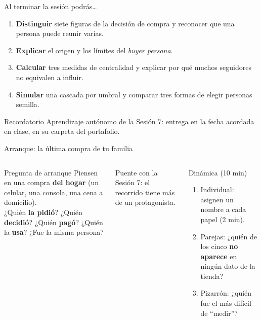 \documentclass[aspectratio=169,xcolor=dvipsnames]{beamer}
\begin{document}
\begin{frame}{Al terminar la sesión podrás\ldots}
\begin{enumerate}
  \item \textbf{Distinguir} siete figuras de la decisión de compra y reconocer que una persona puede reunir varias.
  \vspace{4pt}
  \item \textbf{Explicar} el origen y los límites del \textit{buyer persona}.
  \vspace{4pt}
  \item \textbf{Calcular} tres medidas de centralidad y explicar por qué muchos seguidores no equivalen a influir.
  \vspace{4pt}
  \item \textbf{Simular} una cascada por umbral y comparar tres formas de elegir personas semilla.
\end{enumerate}
\vspace{6pt}
\begin{alertblock}{Recordatorio}
  Aprendizaje autónomo de la Sesión 7: entrega en la fecha acordada en clase, en su carpeta del portafolio.
\end{alertblock}
\end{frame}

\begin{frame}{Arranque: la última compra de tu familia}
\begin{columns}[T]
  \begin{exampleblock}{Pregunta de arranque}
    Piensen en una compra \textbf{del hogar} (un celular, una consola, una cena a domicilio).\\[4pt]
    ¿Quién \textbf{la pidió}? ¿Quién \textbf{decidió}? ¿Quién \textbf{pagó}? ¿Quién la \textbf{usa}? ¿Fue la misma persona?
  \end{exampleblock}
  \vspace{4pt}
  {\small\color{IPNgris} Puente con la Sesión 7: el recorrido tiene más de un protagonista.}
  \begin{block}{Dinámica (10 min)}
    \small
    \begin{enumerate}
      \item Individual: asignen un nombre a cada papel (2 min).
      \item Parejas: ¿quién de los cinco \textbf{no aparece} en ningún dato de la tienda?
      \item Pizarrón: ¿quién fue el más difícil de \enquote{medir}?
    \end{enumerate}
  \end{block}
\end{columns}
\end{frame}
\end{document}
